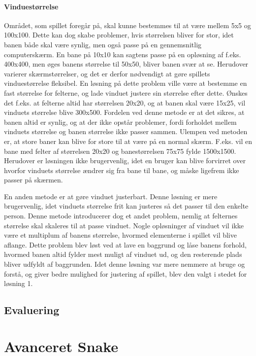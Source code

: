 \documentclass{report}
\begin{document}
\subsubsection{Vinduestørrelse}
Området, som spillet foregår på, skal kunne bestemmes til at være mellem 5x5 og 100x100. Dette kan dog skabe problemer, hvis størrelsen bliver for stor, idet banen både skal være synlig, men også passe på en gennemsnitlig computerskærm. En bane på 10x10 kan sagtens passe på en opløsning af f.eks. 400x400, men øges banens størrelse til 50x50, bliver banen svær at se. Herudover varierer skærmstørrelser, og det er derfor nødvendigt at gøre spillets vinduestørrelse fleksibel. En løsning på dette problem ville være at bestemme en fast størrelse for felterne, og lade vinduet justere sin størrelse efter dette. Ønskes det f.eks. at felterne altid har størrelsen 20x20, og at banen skal være 15x25, vil vinduets størrelse blive 300x500. Fordelen ved denne metode er at det sikres, at banen altid er synlig, og at der ikke opstår problemer, fordi forholdet mellem vinduets størrelse og banen størrelse ikke passer sammen. Ulempen ved metoden er, at store baner kan blive for store til at være på en normal skærm. F.eks. vil en bane med felter af størrelsen 20x20 og banestørrelsen 75x75 fylde 1500x1500. Herudover er løsningen ikke brugervenlig, idet en bruger kan blive forvirret over hvorfor vinduets størrelse ændrer sig fra bane til bane, og måske ligefrem ikke passer på skærmen.

En anden metode er at gøre vinduet justerbart. Denne løsning er mere brugervenlig, idet vinduets størrelse frit kan justeres så det passer til den enkelte person. Denne metode introducerer dog et andet problem, nemlig at felternes størrelse skal skaleres til at passe vinduet. Nogle opløsninger af vinduet vil ikke være et multiplum af banens størrelse, hvormed elementerne i spillet vil blive aflange. Dette problem blev løst ved at lave en baggrund og låse banens forhold, hvormed banen altid fylder mest muligt af vinduet ud, og den resterende plads bliver udfyldt af baggrunden. Idet denne løsning var mere nemmere at bruge og forstå, og giver bedre mulighed for justering af spillet, blev den valgt i stedet for løsning 1.

\section{Evaluering}

\chapter{Avanceret Snake}
\end{document}
